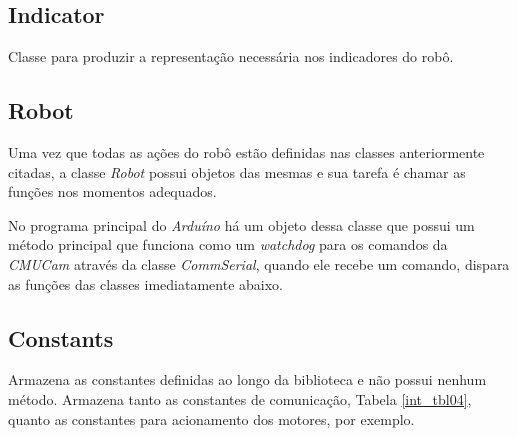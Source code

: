 \subsection{Indicator}

Classe para produzir a representação necessária nos indicadores do robô.

\subsection{Robot}

Uma vez que todas as ações do robô estão definidas nas classes anteriormente citadas, a classe \textit{Robot} possui objetos das mesmas e sua tarefa é chamar as funções nos momentos adequados. 

No programa principal do \textit{Arduíno} há um objeto dessa classe que possui um método principal que funciona como um \textit{watchdog} para os comandos da \textit{CMUCam} através da classe \textit{CommSerial}, quando ele recebe um comando, dispara as funções das classes imediatamente abaixo.

\subsection{Constants}

Armazena as constantes definidas ao longo da biblioteca e não possui nenhum método. Armazena tanto as constantes de comunicação, Tabela \ref{int_tbl04}, quanto as constantes para acionamento dos motores, por exemplo.


